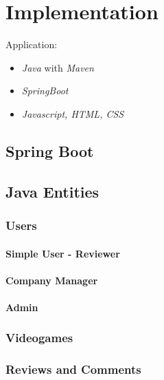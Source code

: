 \chapter{Implementation}
Application: 
\begin{itemize}
	\item \emph{Java} with \emph{Maven} 
	\item \emph{SpringBoot}
	\item \emph{Javascript, HTML, CSS} 
\end{itemize}
\section{Spring Boot}
\section{Java Entities}
\subsection{Users}
\subsubsection{Simple User - Reviewer}
\subsubsection{Company Manager}
\subsubsection{Admin}
\subsection{Videogames}
\subsection{Reviews and Comments}

